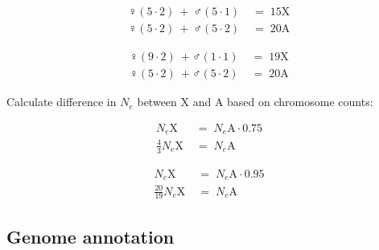 \documentclass{article}
\begin{document}
\begin{minipage}{.5\textwidth}
    \begin{center}
    \begin{align*}
        \female (5 \cdot 2) \: + \: \male (5 \cdot 1) \; &= \; 15 \text{X}\\
        \female (5 \cdot 2) \: + \: \male (5 \cdot 2) \; &= \; 20 \text{A}
    \end{align*}
    \end{center}
\end{minipage}%
\begin{minipage}{.5\textwidth}
    \begin{center}
    \begin{align*}
        \female (9 \cdot 2) \: + \male (1 \cdot 1) \; &= \; 19 \text{X}\\
        \female (5 \cdot 2) \: + \male (5 \cdot 2) \; &= \; 20 \text{A}
    \end{align*}
    \end{center}
\end{minipage}

\vspace{0.25cm}
\noindent
Calculate difference in $N_e$ between X and A based on chromosome counts:
\vspace{-0.25cm}

\begin{minipage}{.5\textwidth}
    \begin{center}
    \begin{align*}
        N_e \text{X} \; &= \; N_e \text{A} \cdot 0.75\\
        \frac{4}{3} N_e \text{X} \; &= \; N_e \text{A}
    \end{align*}
    \end{center}
\end{minipage}%
\begin{minipage}{.5\textwidth}
    \begin{center}
    \begin{align*}
        N_e \text{X} \; &= \; N_e \text{A} \cdot 0.95\\
        \frac{20}{19} N_e \text{X} \; &= \; N_e \text{A}
    \end{align*}
    \end{center}
\end{minipage}

\newpage
\fi

\subsection*{Genome annotation}
\end{document}
